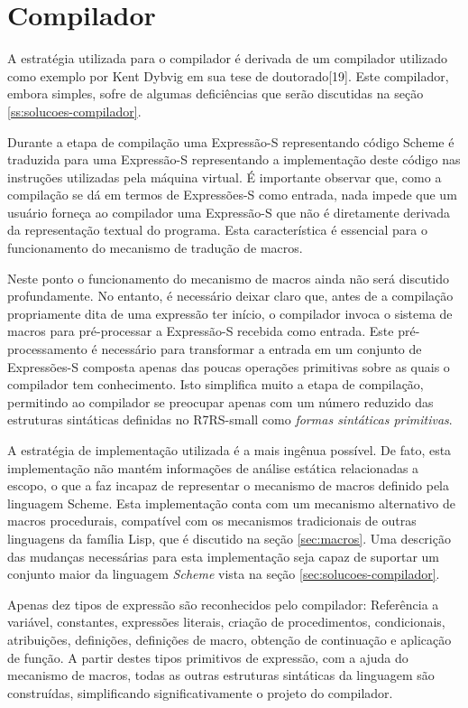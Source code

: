 \section{Compilador}
\label{sec:compilador}

A estratégia utilizada para o compilador é derivada de um compilador utilizado
como exemplo por Kent Dybvig em sua tese de doutorado[19]. Este compilador,
embora simples, sofre de algumas deficiências que serão discutidas na seção
\ref{ss:solucoes-compilador}.

Durante a etapa de compilação uma Expressão-S representando código Scheme é
traduzida para uma Expressão-S representando a implementação deste código nas
instruções utilizadas pela máquina virtual. É importante observar que, como a compilação se
dá em termos de Expressões-S como entrada, nada impede que um usuário forneça
ao compilador uma Expressão-S que não é diretamente derivada da representação
textual do programa. Esta característica é essencial para o funcionamento do
mecanismo de tradução de macros.

Neste ponto o funcionamento do mecanismo de macros ainda não será discutido
profundamente. No entanto, é necessário deixar claro que, antes de a compilação
propriamente dita de uma expressão ter início, o compilador invoca o sistema de
macros para pré-processar a Expressão-S recebida como entrada. Este
pré-processamento é necessário para transformar a entrada em um conjunto de
Expressões-S composta apenas das poucas operações primitivas sobre as quais o
compilador tem conhecimento. Isto simplifica muito a etapa de compilação,
permitindo ao compilador se preocupar apenas com um número reduzido das
estruturas sintáticas definidas no R7RS-small como \textit{formas sintáticas
primitivas}.

A estratégia de implementação utilizada é a mais ingênua possível. De fato,
esta implementação não mantém informações de análise estática relacionadas a
escopo, o que a faz incapaz de representar o mecanismo de macros definido pela
linguagem Scheme. Esta implementação conta com um mecanismo alternativo de
macros procedurais, compatível com os mecanismos tradicionais de outras
linguagens da família Lisp, que é discutido na seção \ref{sec:macros}. Uma
descrição das mudanças necessárias para esta implementação seja capaz de 
suportar um conjunto maior da linguagem \textit{Scheme}
vista na seção \ref{sec:solucoes-compilador}.

Apenas dez tipos de expressão são reconhecidos pelo compilador: Referência a variável,
constantes,  expressões literais, criação de procedimentos, condicionais,
atribuições, definições, definições de macro, obtenção de continuação e
aplicação de função. A partir destes tipos primitivos de expressão, com a ajuda
do mecanismo de macros, todas as outras estruturas sintáticas da linguagem são
construídas, simplificando significativamente o projeto do compilador.

